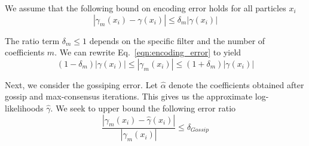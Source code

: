 \documentclass[10pt,letterpaper,final]{article}
\begin{document}

We assume that the following bound on encoding error holds for all particles $x_i$
\begin{equation}
|\gamma_{m}(x_i) - \gamma(x_i)|\leq \delta_m|\gamma(x_i)| 
\label{eqn:encoding_error}
\end{equation}


The ratio term $\delta_m\leq 1$ depends on the specific filter and the number of coefficients $m$. We can rewrite Eq.~\eqref{eqn:encoding_error} to yield
\begin{equation}
(1-\delta_m)|\gamma(x_i)| \leq |\gamma_m(x_i)| \leq (1+\delta_m)|\gamma(x_i)|
\end{equation}

%

Next, we consider the gossiping error. Let $\hat{\alpha}$ denote the coefficients obtained after gossip and max-consensus iterations. This gives us the approximate log-likelihoods $\hat{\gamma}$. We seek to upper bound the following error ratio
\begin{equation}
\frac{|\gamma_m(x_i)-\hat{\gamma}(x_i)|}{|\gamma_m(x_i)|} \leq \delta_{Gossip}
\label{eqn:gossiping_error}
\end{equation}
\end{document}
